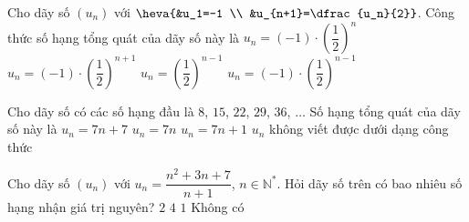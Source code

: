 \begin{ex}%
	Cho dãy số $(u_n)$ với $\heva{&u_1=-1 \\ &u_{n+1}=\dfrac{u_n}{2}}$. Công thức  số hạng tổng quát của dãy số này là
	\choice 
		{$u_n=(-1)  \cdot \left(\dfrac{1}{2}\right)^n$}
		{$u_n=(-1) \cdot \left(\dfrac{1}{2}\right)^{n+1}$} 
		 {$u_n=\left(\dfrac{1}{2}\right)^{n-1}$}
		{\True $u_n=(-1)  \cdot \left(\dfrac{1}{2}\right)^{n-1}$}
\end{ex}

\begin{ex}%
	Cho dãy số có các số hạng đầu là $8$, $15$, $22$, $29$, $36$, $\ldots$ Số hạng tổng quát của dãy  số này là
	\choice 
		{$u_n=7n+7$} 
		{$u_n=7n$} 
		 {\True $u_n=7n+1$}
		{$u_n$ không viết  được dưới dạng công thức}
\end{ex}

\begin{ex}%
	Cho dãy số $\left(u_n \right)$ với $u_n=\dfrac{n^2+3n+7}{n+1}$, $n\in \mathbb{N}^{*}$. Hỏi dãy số trên có bao  nhiêu số hạng nhận giá trị nguyên?
	 \choice
		{$2$} 
		 {$4$}
		{\True $1$} 
		 {Không có}
\end{ex}


